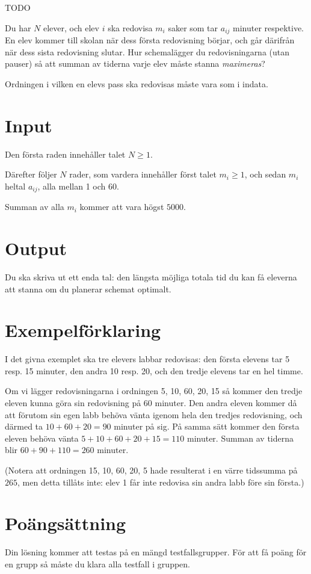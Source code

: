 
TODO

Du har $N$ elever, och elev $i$ ska redovisa $m_i$ saker som tar $a_{ij}$ minuter respektive.
En elev kommer till skolan när dess första redovisning börjar, och går därifrån när dess sista redovisning slutar.
Hur schemalägger du redovisningarna (utan pauser) så att summan av tiderna varje elev måste stanna \emph{maximeras}?

Ordningen i vilken en elevs pass ska redovisas måste vara som i indata.

\section*{Input}
Den första raden innehåller talet $N \ge 1$.

Därefter följer $N$ rader, som vardera innehåller först talet $m_i \ge 1$, och sedan $m_i$ heltal $a_{ij}$, alla mellan 1 och 60.

Summan av alla $m_i$ kommer att vara högst $5000$.

\section*{Output}
Du ska skriva ut ett enda tal: den längsta möjliga totala tid du kan få eleverna att stanna om du planerar schemat optimalt.

\section*{Exempelförklaring}
I det givna exemplet ska tre elevers labbar redovisas: den första elevens tar 5 resp. 15 minuter, den andra 10 resp. 20, och den tredje elevens tar en hel timme.

Om vi lägger redovisningarna i ordningen 5, 10, 60, 20, 15 så kommer den tredje eleven kunna göra sin redovisning på 60 minuter.
Den andra eleven kommer då att förutom sin egen labb behöva vänta igenom hela den tredjes redovisning, och därmed ta $10+60+20 = 90$ minuter på sig.
På samma sätt kommer den första eleven behöva vänta $5+10+60+20+15 = 110$ minuter.
Summan av tiderna blir $60 + 90 + 110 = 260$ minuter.

(Notera att ordningen 15, 10, 60, 20, 5 hade resulterat i en värre tidssumma på $265$, men detta tillåts inte: elev 1 får inte redovisa sin andra labb före sin första.)

\section*{Poängsättning}
Din lösning kommer att testas på en mängd testfallsgrupper. För att få poäng för en grupp så måste du klara alla testfall i gruppen.

